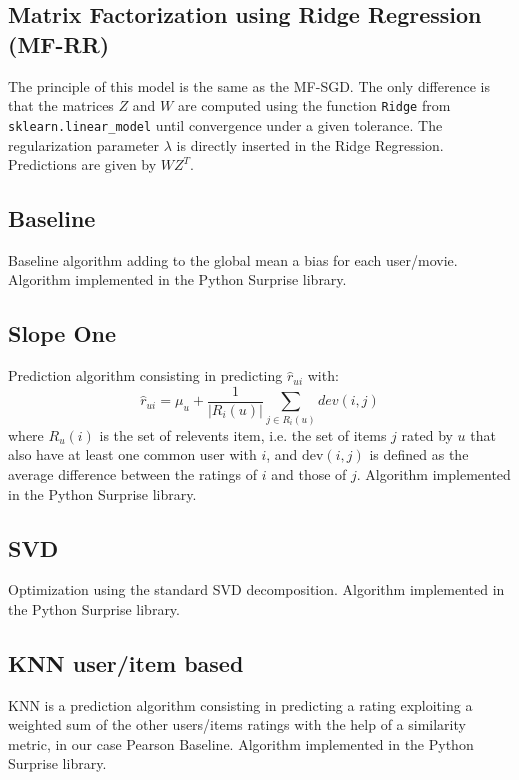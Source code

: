 \documentclass[10pt,conference,compsocconf]{IEEEtran}
\begin{document}
\subsection{Matrix Factorization using Ridge Regression (MF-RR)}

The principle of this model is the same as the MF-SGD. The only difference is that the matrices $Z$ and $W$ are computed using the function \texttt{Ridge} from \texttt{sklearn.linear\_model} until convergence under a given tolerance. The regularization parameter $\lambda$ is directly inserted in the Ridge Regression. Predictions are given by $WZ^T$.

\subsection{Baseline}
Baseline algorithm adding to the global mean a bias for each user/movie. Algorithm implemented in the
Python Surprise library. \cite{library:surprise}


\subsection{Slope One}
Prediction algorithm consisting in predicting $\hat r_{ui}$ with:
$$ \hat r_{ui}=\mu_u + \frac{1}{|R_i(u)|}\sum_{j\in R_i(u)} dev(i,j)$$
where $R_u(i)$ is the set of relevents item, i.e. the set of items $j$ rated by $u$ that also have
at least one common user with $i$, and $\text{dev}(i,j)$ is defined as the average difference
between the ratings of $i$ and those of $j$. Algorithm implemented in the Python Surprise library.
\cite{library:surprise} \cite{lemire2005slope}

\subsection{SVD}
Optimization using the standard SVD decomposition. Algorithm implemented in the Python Surprise library. \cite{library:surprise}

\subsection{KNN user/item based}
KNN is a prediction algorithm consisting in predicting a rating exploiting a weighted sum 
of the other users/items ratings with the help of a similarity metric, in our case Pearson Baseline. Algorithm implemented in the Python Surprise library. \cite{library:surprise}


\end{document}
